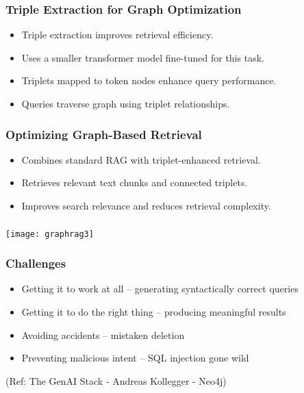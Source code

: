 \begin{frame}[fragile]\frametitle{Triple Extraction for Graph Optimization}
    \begin{itemize}
        \item Triple extraction improves retrieval efficiency.
        \item Uses a smaller transformer model fine-tuned for this task.
        \item Triplets mapped to token nodes enhance query performance.
        \item Queries traverse graph using triplet relationships.
    \end{itemize}
\end{frame}

\begin{frame}[fragile]\frametitle{Optimizing Graph-Based Retrieval}
    \begin{itemize}
        \item Combines standard RAG with triplet-enhanced retrieval.
        \item Retrieves relevant text chunks and connected triplets.
        \item Improves search relevance and reduces retrieval complexity.
    \end{itemize}
\end{frame}




\begin{frame}[fragile]\frametitle{}

	\begin{center}
	\texttt{[image: graphrag3]}
	\end{center}
	
	
\end{frame}

\begin{frame}[fragile]\frametitle{Challenges}
    \begin{itemize}
        \item Getting it to work at all – generating syntactically correct queries
        \item Getting it to do the right thing – producing meaningful results
        \item Avoiding accidents – mistaken deletion
        \item Preventing malicious intent – SQL injection gone wild
    \end{itemize}
	
	{\tiny (Ref: The GenAI Stack - Andreas Kollegger - Neo4j)}
	
\end{frame}


